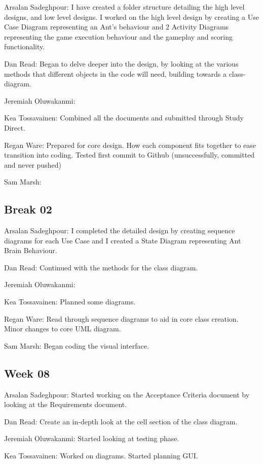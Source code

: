 \documentclass[11pt]{article}
\begin{document}
Arsalan Sadeghpour: I have created a folder structure detailing the high level designs, and low level designs. I worked on the high level design by creating a Use Case Diagram representing an Ant's behaviour and 2 Activity Diagrams representing the game execution behaviour and the gameplay and scoring functionality.

Dan Read: Began to delve deeper into the design, by looking at the various methods that different objects in the code will need, building towards a class-diagram.

Jeremiah Oluwakanmi:

Kea Tossavainen: Combined all the documents and submitted through Study Direct.

Regan Ware: Prepared for core design. How each component fits together to ease transition into coding. Tested first commit to Github (unsuccessfully, committed and never pushed)

Sam Marsh: 

\subsection{Break 02}

Arsalan Sadeghpour: I completed the detailed design by creating sequence diagrams for each Use Case and I created a State Diagram representing Ant Brain Behaviour.

Dan Read: Continued with the methods for the class diagram.

Jeremiah Oluwakanmi:

Kea Tossavainen: Planned some diagrams.

Regan Ware: Read through sequence diagrams to aid in core class creation. Minor changes to core UML diagram.

Sam Marsh: Began coding the visual interface.

\subsection{Week 08}

Arsalan Sadeghpour: Started working on the Acceptance Criteria document by looking at the Requirements document.

Dan Read: Create an in-depth look at the cell section of the class diagram.

Jeremiah Oluwakanmi: Started looking at testing phase.

Kea Tossavainen: Worked on diagrams. Started planning GUI.
\end{document}
